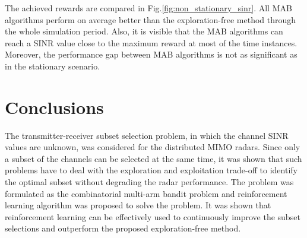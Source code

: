 \documentclass[conference]{IEEEtran}
\begin{document}
The achieved rewards are compared in Fig.\ref{fig:non_stationary_sinr}.
All MAB algorithms perform on average better than the exploration-free method through the whole simulation period.
Also, it is visible that the MAB algorithms can reach a SINR value close to the maximum reward at most of the time instances. 
Moreover, the performance gap between MAB algorithms is not as significant as in the stationary scenario.


\section{Conclusions}
\label{sec:concl}
The transmitter-receiver subset selection problem, in which the channel SINR values are unknown, was considered for the distributed MIMO radars.
Since only a subset of the channels can be selected at the same time, it was shown that such problems have to deal with the exploration and exploitation trade-off to identify the optimal subset without degrading the radar performance.
The problem was formulated as the combinatorial multi-arm bandit problem and reinforcement learning algorithm was proposed to solve the problem.
It was shown that reinforcement learning can be effectively used to continuously improve the subset selections and outperform the proposed exploration-free method.




\balance
\end{document}
